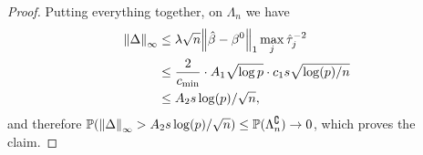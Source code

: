 \begin{proof}
Putting everything together, on $\Lambda_n$ we have
\begin{align*}
	\norm{\Delta}_\infty &\leq \lambda \sqrt n \norm{\hat\beta- \beta^0}_1 \max_j \hat\tau_j^{-2} \\
	&\leq \frac{2}{c_\mathrm{min}} \cdot A_1 \sqrt{\log p} \cdot c_1 s \sqrt{\log(p)/n} \\
	&\leq A_2 s \log(p)/\sqrt n, 
\end{align*}
and therefore  $\mathbb P(\norm{\Delta}_\infty > A_2 s \log(p)/\sqrt n) \leq \mathbb P(\Lambda_n^\complement) \to 0$, which proves the claim.
\end{proof}
